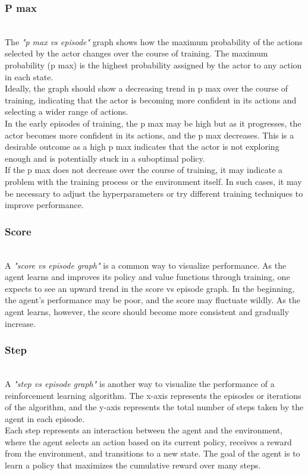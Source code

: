 \documentclass[preprint,12pt]{elsarticle}
\begin{document}
\subsubsection{P max}\\
The \textit{"p max vs episode"} graph shows how the maximum probability of the actions selected by the actor changes over the course of training. The maximum probability (p max) is the highest probability assigned by the actor to any action in each state.\\
Ideally, the graph should show a decreasing trend in p max over the course of training, indicating that the actor is becoming more confident in its actions and selecting a wider range of actions.\\
In the early episodes of training, the p max may be high but as it progresses, the actor becomes more confident in its actions, and the p max decreases. This is a desirable outcome as a high p max indicates that the actor is not exploring enough and is potentially stuck in a suboptimal policy.\\
If the p max does not decrease over the course of training, it may indicate a problem with the training process or the environment itself. In such cases, it may be necessary to adjust the hyperparameters or try different training techniques to improve performance.\\

\subsubsection{Score}\\
A \textit{"score vs episode graph"} is a common way to visualize performance. As the agent learns and improves its policy and value functions through training, one expects to see an upward trend in the score vs episode graph. In the beginning, the agent's performance may be poor, and the score may fluctuate wildly. As the agent learns, however, the score should become more consistent and gradually increase.\\

\subsubsection{Step}\\
A \textit{"step vs episode graph"} is another way to visualize the performance of a reinforcement learning algorithm. The x-axis represents the episodes or iterations of the algorithm, and the y-axis represents the total number of steps taken by the agent in each episode.\\
Each step represents an interaction between the agent and the environment, where the agent selects an action based on its current policy, receives a reward from the environment, and transitions to a new state. The goal of the agent is to learn a policy that maximizes the cumulative reward over many steps.\\
\end{document}
